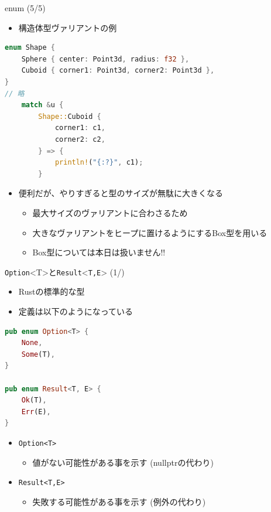 \documentclass[cjk,dvipdfmx,10pt,compress,fragile%
hyperref={bookmarks=true,bookmarksnumbered=true,bookmarksopen=false,%
colorlinks=false,%
pdftitle={第 134 回 関西 Debian 勉強会},%
pdfauthor={小林},%
pdfsubject={資料},%
}]{beamer}
\begin{document}
\begin{frame}[t,fragile]{enum (5/5)}
\begin{itemize}
 \item 構造体型ヴァリアントの例
\end{itemize}
\begin{lstlisting}[language=Rust,style=boxed,style=colouredRust,basicstyle=\small\tt,lineskip=-2pt]
enum Shape {
    Sphere { center: Point3d, radius: f32 },
    Cuboid { corner1: Point3d, corner2: Point3d },
}
// 略
    match &u {
        Shape::Cuboid {
            corner1: c1,
            corner2: c2,
        } => {
            println!("{:?}", c1);
        }\end{lstlisting}
 \begin{itemize}
  \item 便利だが、やりすぎると型のサイズが無駄に大きくなる
	\begin{itemize}
	 \item 最大サイズのヴァリアントに合わさるため
	 \item 大きなヴァリアントをヒープに置けるようにするBox型を用いる
	 \item Box型については本日は扱いません!!
	\end{itemize}
 \end{itemize}
\end{frame}

\begin{frame}[t,fragile]{\texttt{Option}<T>と\texttt{Result}<\texttt{T,E}> (1/)}
 \begin{itemize}
  \item Rustの標準的な型
  \item 定義は以下のようになっている
 \end{itemize}
\begin{lstlisting}[language=Rust,style=boxed,style=colouredRust,basicstyle=\small\tt,lineskip=-2pt]
pub enum Option<T> {
    None,
    Some(T),
}

pub enum Result<T, E> {
    Ok(T),
    Err(E),
}\end{lstlisting}
\begin{itemize}
  \item \verb|Option<T>|
	\begin{itemize}
	 \item 値がない可能性がある事を示す (nullptrの代わり)
	\end{itemize}
 \item \verb|Result<T,E>|
       \begin{itemize}
	\item 失敗する可能性がある事を示す (例外の代わり)
       \end{itemize}
\end{itemize}
\end{frame}
\end{document}
